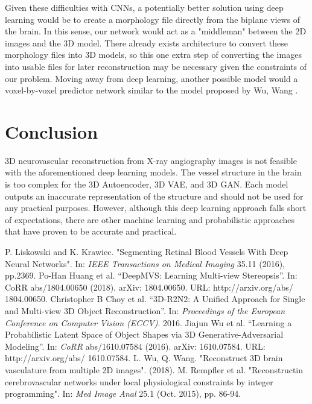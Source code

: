 \documentclass[conference, 10pt]{IEEEtran}
\begin{document}
Given these difficulties with CNNs, a potentially better solution using deep
learning would be to create a morphology file directly from the biplane views
of the brain. In this sense, our network would act as a "middleman" between
the 2D images and the 3D model. There already exists architecture to convert 
these morphology files into 3D models, so this one extra step of converting
the images into usable files for later reconstruction may be necessary given
the constraints of our problem. Moving away from deep learning, another possible
model would a voxel-by-voxel predictor network similar to the model proposed by 
Wu, Wang \cite{ML approach}.


\section{Conclusion}
3D neurovascular reconstruction from X-ray angiography images is not feasible with the aforementioned deep learning models. The vessel structure in the brain is too complex for the 3D Autoencoder, 3D VAE, and 3D GAN. Each model outputs an inaccurate representation of the structure and should not be used for any practical purposes. However, although this deep learning approach falls short of expectations, there are other machine learning \cite{ML approach}  and probabilistic \cite{Probabililstic approach} approaches that have proven to be accurate and practical. 


\begin{thebibliography}{00}
 P. Liskowski and K. Krawiec. "Segmenting Retinal Blood Vessels With Deep Neural Networks". In: \textit{IEEE Transactions on Medical Imaging} 35.11 (2016), pp.2369.
 Po-Han Huang et al. “DeepMVS: Learning Multi-view Stereopsis”. In: CoRR abs/1804.00650 (2018). arXiv: 1804.00650. URL: http://arxiv.org/abs/ 1804.00650.
 Christopher B Choy et al. “3D-R2N2: A Unified Approach for Single and Multi-view 3D Object Reconstruction”. In: \textit{Proceedings of the European Conference on Computer Vision (ECCV)}. 2016.
 Jiajun Wu et al. “Learning a Probabilistic Latent Space of Object Shapes via 3D Generative-Adversarial Modeling”. In: \textit{CoRR} abs/1610.07584 (2016). arXiv: 1610.07584. URL: http://arxiv.org/abs/ 1610.07584.
 L. Wu, Q. Wang. "Reconstruct 3D brain vasculature from multiple 2D images". (2018).
 M. Rempfler et al. "Reconstructin cerebrovascular networks under local physiological constraints by integer programming". In: \textit{Med Image Anal} 25.1 (Oct. 2015), pp. 86-94.
\end{thebibliography}
\vspace{12pt}
\end{document}
